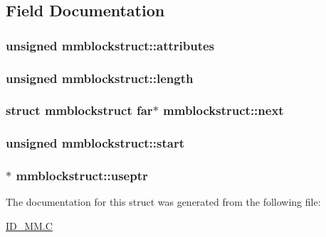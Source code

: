 \subsection{Field Documentation}
\hypertarget{structmmblockstruct_afa3e5ca318d4ec6bdebf0ad5f315077b}{
\subsubsection[{attributes}]{\setlength{\rightskip}{0pt plus 5cm}unsigned {\bf mmblockstruct::attributes}}}
\label{structmmblockstruct_afa3e5ca318d4ec6bdebf0ad5f315077b}
\hypertarget{structmmblockstruct_af24830b558d728e27b77b7ab3a0881d5}{
\subsubsection[{length}]{\setlength{\rightskip}{0pt plus 5cm}unsigned {\bf mmblockstruct::length}}}
\label{structmmblockstruct_af24830b558d728e27b77b7ab3a0881d5}
\hypertarget{structmmblockstruct_afcfe2dec09baa09907163df789ef12d9}{
\subsubsection[{next}]{\setlength{\rightskip}{0pt plus 5cm}struct {\bf mmblockstruct} far$\ast$ {\bf mmblockstruct::next}}}
\label{structmmblockstruct_afcfe2dec09baa09907163df789ef12d9}
\hypertarget{structmmblockstruct_afb20ac4ca3cc6f410876ad34f699f3a0}{
\subsubsection[{start}]{\setlength{\rightskip}{0pt plus 5cm}unsigned {\bf mmblockstruct::start}}}
\label{structmmblockstruct_afb20ac4ca3cc6f410876ad34f699f3a0}
\hypertarget{structmmblockstruct_acd45c42efd04e4b4d9a60ec3c200d5f0}{
\subsubsection[{useptr}]{$\ast$ {\bf mmblockstruct::useptr}}}
\label{structmmblockstruct_acd45c42efd04e4b4d9a60ec3c200d5f0}


The documentation for this struct was generated from the following file:\begin{DoxyCompactItemize}
\item 
\hyperlink{ID__MM_8C}{ID\_\-MM.C}\end{DoxyCompactItemize}
